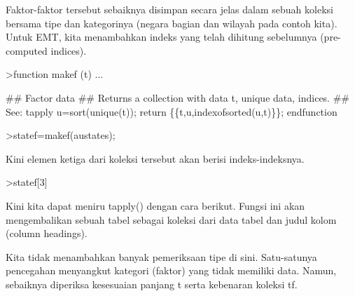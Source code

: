 \documentclass{article}
\newenvironment{eulernotebook}{\par}{\par}
\newenvironment{eulercomment}{\par\medskip}{\par\medskip}
\begin{document}
\begin{eulernotebook}
\begin{eulercomment}
\begin{eulercomment}
\begin{eulercomment}
\begin{eulercomment}
\begin{eulercomment}
Faktor-faktor tersebut sebaiknya disimpan secara jelas dalam sebuah
koleksi bersama tipe dan kategorinya (negara bagian dan wilayah pada
contoh kita). Untuk EMT, kita menambahkan indeks yang telah dihitung
sebelumnya (pre-computed indices).
\end{eulercomment}
\begin{eulerprompt}
>function makef (t) ...
\end{eulerprompt}
\begin{eulerudf}
  ## Factor data
  ## Returns a collection with data t, unique data, indices.
  ## See: tapply
  u=sort(unique(t));
  return \{\{t,u,indexofsorted(u,t)\}\};
  endfunction
\end{eulerudf}
\begin{eulerprompt}
>statef=makef(austates);
\end{eulerprompt}
\begin{eulercomment}
Kini elemen ketiga dari koleksi tersebut akan berisi indeks-indeksnya.
\end{eulercomment}
\begin{eulerprompt}
>statef[3]
\end{eulerprompt}
\begin{euleroutput}
  [6,  5,  4,  2,  2,  3,  8,  8,  4,  7,  2,  7,  4,  4,  5,  6,  5,  3,
  8,  7,  4,  2,  2,  8,  5,  1,  2,  7,  7,  1]
\end{euleroutput}
\begin{eulercomment}
Kini kita dapat meniru tapply() dengan cara berikut. Fungsi ini akan
mengembalikan sebuah tabel sebagai koleksi dari data tabel dan judul
kolom (column headings).
\end{eulercomment}
\begin{eulercomment}
Kita tidak menambahkan banyak pemeriksaan tipe di sini. Satu-satunya
pencegahan menyangkut kategori (faktor) yang tidak memiliki data.
Namun, sebaiknya diperiksa kesesuaian panjang t serta kebenaran
koleksi tf.


\end{eulercomment}
\end{eulercomment}
\end{eulercomment}
\end{eulercomment}
\end{eulercomment}
\end{eulernotebook}
\end{document}
